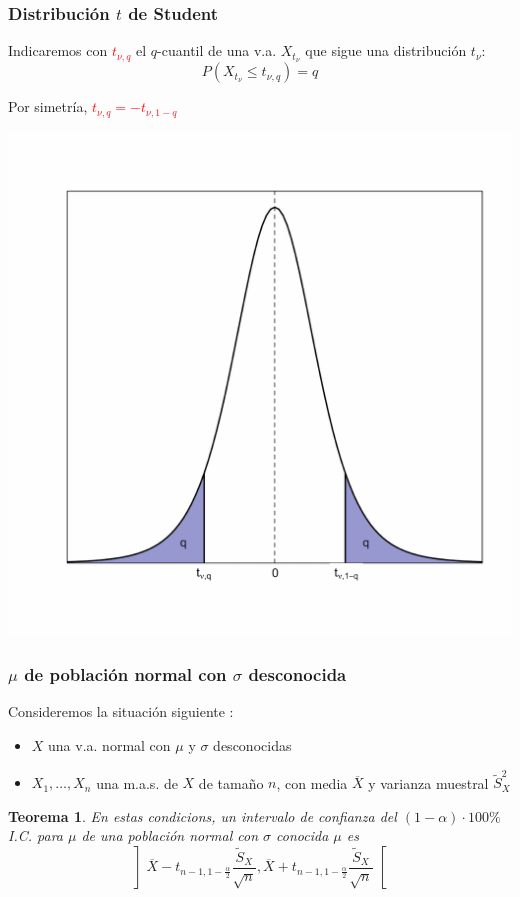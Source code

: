 \documentclass[12pt,t]{beamer}\usepackage[]{graphicx}\usepackage[]{color}
\newcommand{\red}[1]{\textcolor{red}{#1}}
\renewcommand{\leq}{\leqslant}
\theoremstyle{plain}
\newtheorem{teorema}{Teorema}
\theoremstyle{definition}
\begin{document}
\begin{frame}
\frametitle{Distribución $t$ de Student}

Indicaremos con
\red{$t_{\nu,q}$} el  $q$-cuantil de una  v.a.  $X_{t_{\nu}}$ que sigue una distribución $t_\nu$:
$$
P(X_{t_{\nu}}\leq t_{\nu,q})=q
$$

Por simetría,
\red{$t_{\nu,q}=-t_{\nu,1-q}$}
\vspace*{-1ex}

\begin{center}
\includegraphics[width=0.6\linewidth]{quantilt}
\end{center}
\end{frame}



\begin{frame}
\frametitle{$\mu$ de población normal con $\sigma$ desconocida}

Consideremos  la situación siguiente  :
\begin{itemize}
\item  $X$ una v.a.  normal con $\mu$ y $\sigma$ desconocidas

\item $X_1,\ldots,X_n$ una m.a.s. de $X$  de  tamaño  $n$, con media   $\overline{X}$ y varianza muestral $\widetilde{S}_X^2$
\end{itemize}


\begin{teorema}
En estas  condicions, un intervalo  de confianza  del $(1-\alpha)\cdot 100\%$ I.C. para $\mu$ de una población normal con $\sigma$ conocida $\mu$
es 
$$
\left] 
\overline{X}-t_{n-1,1-\frac{\alpha}{2}} \frac{\widetilde{S}_{X}}{\sqrt{n}},
\overline{X}+t_{n-1,1-\frac{\alpha}{2}}\frac{\widetilde{S}_{X}}{\sqrt{n}} \right[
$$
\end{teorema}

\end{frame}
\end{document}
